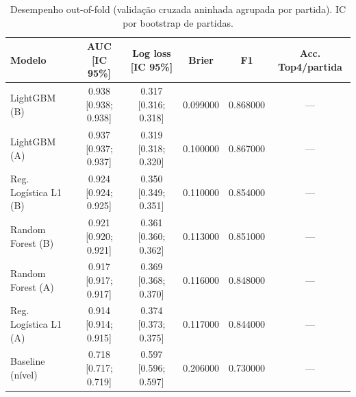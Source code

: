 \begin{table}[htbp]
\caption{Desempenho out-of-fold (validação cruzada aninhada agrupada por partida). IC por bootstrap de partidas.}
\label{tab:metricas}
\centering
\small
\begin{tabular}{lccccc}
\toprule
Modelo & AUC [IC 95\%] & Log loss [IC 95\%] & Brier & F1 & Acc. Top4/partida \\
\midrule
LightGBM (B) & 0.938 [0.938; 0.938] & 0.317 [0.316; 0.318] & 0.099000 & 0.868000 & — \\
LightGBM (A) & 0.937 [0.937; 0.937] & 0.319 [0.318; 0.320] & 0.100000 & 0.867000 & — \\
Reg. Logística L1 (B) & 0.924 [0.924; 0.925] & 0.350 [0.349; 0.351] & 0.110000 & 0.854000 & — \\
Random Forest (B) & 0.921 [0.920; 0.921] & 0.361 [0.360; 0.362] & 0.113000 & 0.851000 & — \\
Random Forest (A) & 0.917 [0.917; 0.917] & 0.369 [0.368; 0.370] & 0.116000 & 0.848000 & — \\
Reg. Logística L1 (A) & 0.914 [0.914; 0.915] & 0.374 [0.373; 0.375] & 0.117000 & 0.844000 & — \\
Baseline (nível) & 0.718 [0.717; 0.719] & 0.597 [0.596; 0.597] & 0.206000 & 0.730000 & — \\
\bottomrule
\end{tabular}
\end{table}
